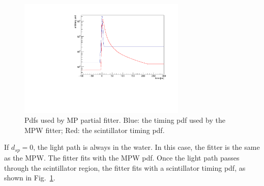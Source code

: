 \documentclass[preprint,12pt]{elsarticle}
\numberwithin{equation}{section}
\begin{document}
\begin{figure}[htbp]
	\centering	
	\includegraphics[width=8cm]{scintpdf.pdf}
	\caption{ Pdfs used by MP partial fitter. Blue: the timing pdf used by the MPW fitter; Red: the scintillator timing pdf.}
	\label{partialpdf}
\end{figure}

If $d_{sp}=0$, the light path is always in the water. In this case, the fitter is the same as the MPW. The fitter fits with the MPW pdf. Once the light path passes through the scintillator region, the fitter fits with a scintillator timing pdf, as shown in Fig.~\ref{partialpdf}.
\end{document}
